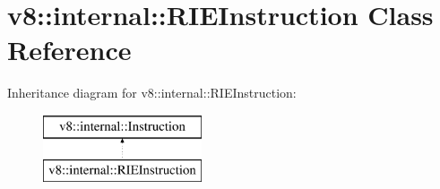 \hypertarget{classv8_1_1internal_1_1_r_i_e_instruction}{}\section{v8\+:\+:internal\+:\+:R\+I\+E\+Instruction Class Reference}
\label{classv8_1_1internal_1_1_r_i_e_instruction}
Inheritance diagram for v8\+:\+:internal\+:\+:R\+I\+E\+Instruction\+:\begin{figure}[H]
\begin{center}
\leavevmode
\includegraphics[height=2.000000cm]{classv8_1_1internal_1_1_r_i_e_instruction}
\end{center}
\end{figure}
